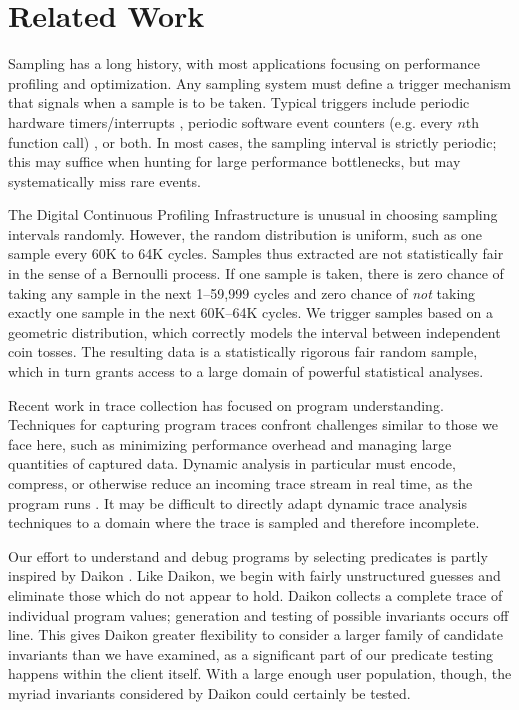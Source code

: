 \section{Related Work}
\label{sec:related-work}

Sampling has a long history, with most applications focusing on
performance profiling and optimization.  Any sampling system must
define a trigger mechanism that signals when a sample is to be taken.
Typical triggers include periodic hardware timers/interrupts
\cite{Burrows:2000:EFV,Traub:200:EILPP,Whaley:337483}, periodic
software event counters (e.g.  every $n$th function call)
\cite{Arnold:2000:ACCTS}, or both.  In most cases, the sampling
interval is strictly periodic; this may suffice when hunting for large
performance bottlenecks, but may systematically miss rare events.

The Digital Continuous Profiling Infrastructure
\cite{Anderson:1997:CPW} is unusual in choosing sampling intervals 
randomly.  However, the random distribution is uniform, such as one
sample every 60K to 64K cycles.  Samples thus extracted are not
statistically fair in the sense of a Bernoulli process.
If one sample is taken, there is zero chance of taking any sample in
the next 1--59,999 cycles and zero chance of
\emph{not} taking exactly one sample in the next 60K--64K cycles.  We
trigger samples based on a geometric distribution, which correctly
models the interval between independent coin tosses.  The resulting
data is a statistically rigorous fair random sample, which in turn
grants access to a large domain of powerful statistical analyses.

Recent work in trace collection has focused on program understanding.
Techniques for capturing program traces confront challenges similar to
those we face here, such as minimizing performance overhead and
managing large quantities of captured data.  Dynamic analysis in
particular must encode, compress, or otherwise reduce an incoming
trace stream in real time, as the program runs
\cite{Demsky:RBEOOP:2002,ICSE01*221}.  It may be difficult to directly
adapt dynamic trace analysis techniques to a domain where the trace is
sampled and therefore incomplete.  

Our effort to understand and debug programs by selecting predicates is
partly inspired by Daikon \cite{ernst2001}.  Like Daikon, we begin
with fairly unstructured guesses and eliminate those which do not
appear to hold.  Daikon collects a complete trace of individual
program values; generation and testing of possible invariants occurs
off line.  This gives Daikon greater flexibility to consider a
larger family of candidate invariants than we have examined, as a
significant part of our predicate testing happens within the client
itself.  With a large enough user population, though, the myriad
invariants considered by Daikon could certainly be tested.

